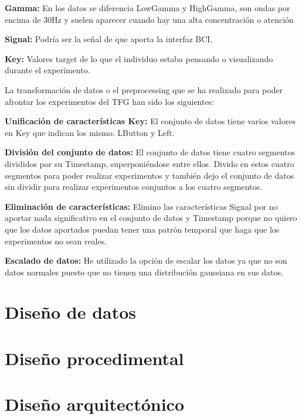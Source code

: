 \textbf{Gamma:} En los datos se diferencia LowGamma y HighGamma, son ondas por encima de 30Hz y suelen aparecer cuando hay una alta concentración o atención

\textbf{Signal:} Podría ser la señal de que aporta la interfaz BCI.

\textbf{Key:} Valores target de lo que el individuo estaba pensando o visualizando durante el experimento.


La transformación de datos o el preprocessing que se ha realizado para poder afrontar los experimentos del TFG han sido los siguientes:


\textbf{Unificación de características Key:} El conjunto de datos tiene varios valores en Key que indican los mismo. LButton y Left.


\textbf{División del conjunto de datos:} El conjunto de datos tiene cuatro segmentos divididos por su Timestamp, superponiéndose entre ellos. Divido en estos cuatro segmentos para poder realizar experimentos y también dejo el conjunto de datos sin dividir para realizar experimentos conjuntos a los cuatro segmentos.


\textbf{Eliminación de características:} Elimino las características Signal por no aportar nada significativo en el conjunto de datos y Timestamp porque no quiero que los datos aportados puedan tener una patrón temporal que haga que los experimentos no sean reales.


\textbf{Escalado de datos:} He utilizado la opción de escalar los datos ya que no son datos normales puesto que no tienen una distribución gaussiana en sus datos. 

\section{Diseño de datos}




\section{Diseño procedimental}



\section{Diseño arquitectónico}

